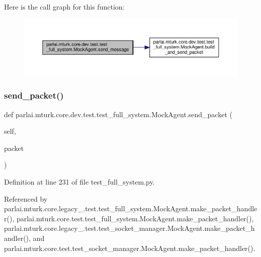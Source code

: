 Here is the call graph for this function\+:
\nopagebreak
\begin{figure}[H]
\begin{center}
\leavevmode
\includegraphics[width=350pt]{classparlai_1_1mturk_1_1core_1_1dev_1_1test_1_1test__full__system_1_1MockAgent_ad083e4d20ea195735ab6694723a65ebd_cgraph}
\end{center}
\end{figure}
\mbox{\label{classparlai_1_1mturk_1_1core_1_1dev_1_1test_1_1test__full__system_1_1MockAgent_a439c09f491611c9d91aea875f44ac435}} 
\subsubsection{\texorpdfstring{send\+\_\+packet()}{send\_packet()}}
{\footnotesize\ttfamily def parlai.\+mturk.\+core.\+dev.\+test.\+test\+\_\+full\+\_\+system.\+Mock\+Agent.\+send\+\_\+packet (\begin{DoxyParamCaption}\item[{}]{self,  }\item[{}]{packet }\end{DoxyParamCaption})}



Definition at line 231 of file test\+\_\+full\+\_\+system.\+py.



Referenced by parlai.\+mturk.\+core.\+legacy\+\_.\+test.\+test\+\_\+full\+\_\+system.\+Mock\+Agent.\+make\+\_\+packet\+\_\+handler(), parlai.\+mturk.\+core.\+test.\+test\+\_\+full\+\_\+system.\+Mock\+Agent.\+make\+\_\+packet\+\_\+handler(), parlai.\+mturk.\+core.\+legacy\+\_.\+test.\+test\+\_\+socket\+\_\+manager.\+Mock\+Agent.\+make\+\_\+packet\+\_\+handler(), and parlai.\+mturk.\+core.\+test.\+test\+\_\+socket\+\_\+manager.\+Mock\+Agent.\+make\+\_\+packet\+\_\+handler().

